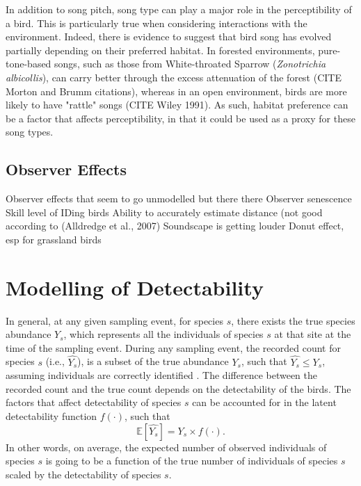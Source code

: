 \par In addition to song pitch, song type can play a major role in the perceptibility of a bird.
This is particularly true when considering interactions with the environment.
Indeed, there is evidence to suggest that bird song has evolved partially depending on their preferred habitat.
In forested environments, pure-tone-based songs, such as those from White-throated Sparrow (\textit{Zonotrichia albicollis}), can carry better through the excess attenuation of the forest (CITE Morton and Brumm citations), whereas in an open environment, birds are more likely to have "rattle" songs (CITE Wiley 1991).
As such, habitat preference can be a factor that affects perceptibility, in that it could be used as a proxy for these song types.

\subsection{Observer Effects} 
Observer effects that seem to go unmodelled but there there 
Observer senescence 
Skill level of IDing birds 
Ability to accurately estimate distance (not good according to (Alldredge et al., 2007) 
Soundscape is getting louder 
Donut effect, esp for grassland birds 

\section{Modelling of Detectability}

\par In general, at any given sampling event, for species $s$, there exists the true species abundance $Y_s$, which represents all the individuals of species $s$ at that site at the time of the sampling event. During any sampling event, the recorded count for species $s$ (i.e., $\hat{Y_s}$), is a subset of the true abundance $Y_s$, such that $\hat{Y_s} \leq Y_s$, assuming individuals are correctly identified \citep{bennett_how_2024, johnson_defense_2008}. The difference between the recorded count and the true count depends on the detectability of the birds. The factors that affect detectability of species $s$ can be accounted for in the latent detectability function $f(\cdot)$, such that
\begin{equation}\label{detect-function}
	\mathbb{E}\left[\hat{Y_s}\right] = Y_s \times f(\cdot).
\end{equation}
In other words, on average, the expected number of observed individuals of species $s$ is going to be a function of the true number of individuals of species $s$ scaled by the detectability of species $s$.

